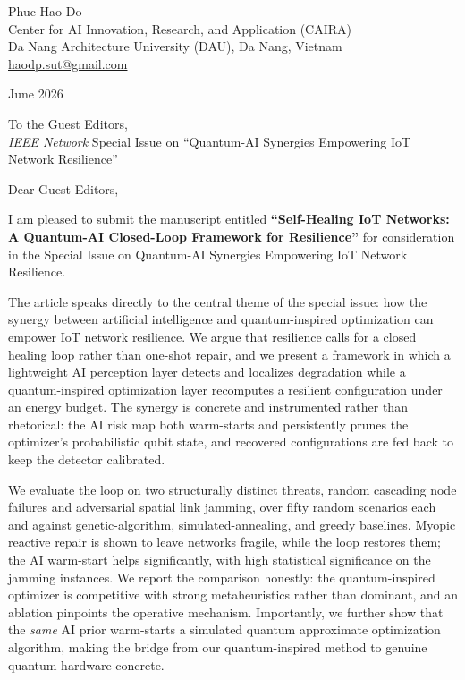 \documentclass[11pt]{article}
\begin{document}
\noindent Phuc Hao Do \\
Center for AI Innovation, Research, and Application (CAIRA) \\
Da Nang Architecture University (DAU), Da Nang, Vietnam \\
\href{mailto:haodp.sut@gmail.com}{haodp.sut@gmail.com}

\vspace{1em}
 June 2026

\vspace{1em}
\noindent To the Guest Editors, \\
\textit{IEEE Network} Special Issue on ``Quantum-AI Synergies Empowering IoT Network Resilience''

\vspace{1em}
\noindent Dear Guest Editors,

I am pleased to submit the manuscript entitled \textbf{``Self-Healing IoT Networks: A Quantum-AI Closed-Loop Framework for Resilience''} for consideration in the Special Issue on Quantum-AI Synergies Empowering IoT Network Resilience.

The article speaks directly to the central theme of the special issue: how the synergy between artificial intelligence and quantum-inspired optimization can empower IoT network resilience. We argue that resilience calls for a closed healing loop rather than one-shot repair, and we present a framework in which a lightweight AI perception layer detects and localizes degradation while a quantum-inspired optimization layer recomputes a resilient configuration under an energy budget. The synergy is concrete and instrumented rather than rhetorical: the AI risk map both warm-starts and persistently prunes the optimizer's probabilistic qubit state, and recovered configurations are fed back to keep the detector calibrated.

We evaluate the loop on two structurally distinct threats, random cascading node failures and adversarial spatial link jamming, over fifty random scenarios each and against genetic-algorithm, simulated-annealing, and greedy baselines. Myopic reactive repair is shown to leave networks fragile, while the loop restores them; the AI warm-start helps significantly, with high statistical significance on the jamming instances. We report the comparison honestly: the quantum-inspired optimizer is competitive with strong metaheuristics rather than dominant, and an ablation pinpoints the operative mechanism. Importantly, we further show that the \emph{same} AI prior warm-starts a simulated quantum approximate optimization algorithm, making the bridge from our quantum-inspired method to genuine quantum hardware concrete.
\end{document}
